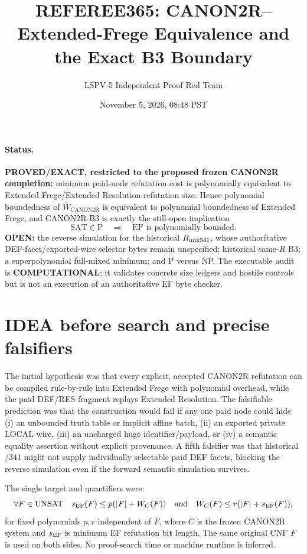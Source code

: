 \documentclass[11pt]{article}
\title{REFEREE365: CANON2R--Extended-Frege Equivalence and the Exact B3 Boundary}
\author{LSPV-5 Independent Proof Red Team}
\date{November 5, 2026, 08:48 PST}
\begin{document}
\maketitle

\paragraph{Status.}
\textbf{PROVED/EXACT, restricted to the proposed frozen CANON2R completion:}
minimum paid-node refutation cost is polynomially equivalent to Extended
Frege/Extended Resolution refutation size.  Hence polynomial boundedness of
$\overline W_{\mathrm{CANON2R}}$ is equivalent to polynomial boundedness of
Extended Frege, and CANON2R-B3 is exactly the still-open implication
\[
  \mathrm{SAT}\in\mathrm P\quad\Longrightarrow\quad
  \mathrm{EF}\text{ is polynomially bounded}.
\]
\textbf{OPEN:} the reverse simulation for the historical $R_{\rm mix341}$,
whose authoritative DEF-facet/exported-wire selector bytes remain unspecified;
historical same-$R$ B3; a superpolynomial full-mixed minimum; and P versus NP.
The executable audit is \textbf{COMPUTATIONAL}; it validates concrete size
ledgers and hostile controls but is not an execution of an authoritative EF
byte checker.

\section{IDEA before search and precise falsifiers}

The initial hypothesis was that every explicit, accepted CANON2R refutation
can be compiled rule-by-rule into Extended Frege with polynomial overhead,
while the paid DEF/RES fragment replays Extended Resolution.  The falsifiable
prediction was that the construction would fail if any one paid node could
hide (i) an unbounded truth table or implicit affine batch, (ii) an exported
private LOCAL wire, (iii) an uncharged huge identifier/payload, or (iv) a
semantic equality assertion without explicit provenance.  A fifth falsifier
was that historical /341 might not supply individually selectable paid DEF
facets, blocking the reverse simulation even if the forward semantic
simulation survives.

The single target and quantifiers were:
\[
\forall F\in\mathrm{UNSAT}\quad
 s_{\rm EF}(F)\le p(|F|+W_C(F))
 \quad\hbox{and}\quad
 W_C(F)\le r(|F|+s_{\rm EF}(F)),
\]
for fixed polynomials $p,r$ independent of $F$, where $C$ is the frozen
CANON2R system and $s_{\rm EF}$ is minimum EF refutation bit length.  The same
original CNF $F$ is used on both sides.  No proof-search time or machine runtime
is inferred.
\end{document}
